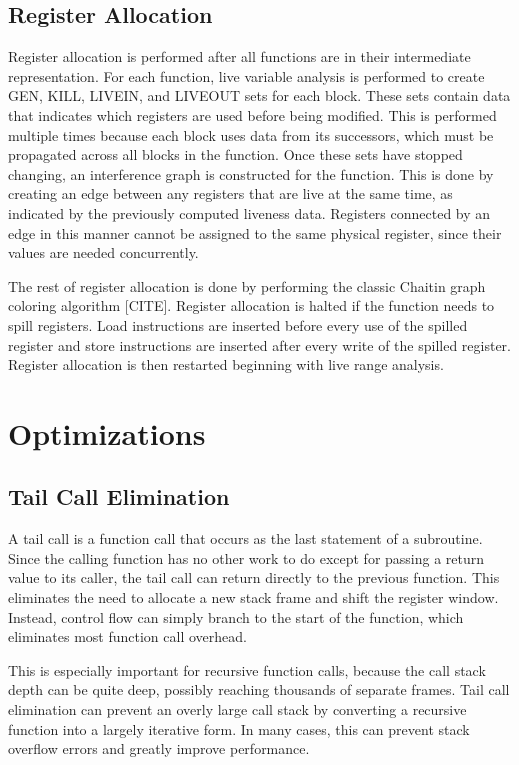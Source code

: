 \documentclass[12pt]{article}
\begin{document}
\begin{multicols}{2}
\subsection{Register Allocation}
Register allocation is performed after all functions are in their intermediate representation.
For each function, live variable analysis is performed to create GEN, KILL, LIVEIN, and LIVEOUT sets for each block.
These sets contain data that indicates which registers are used before being modified.
This is performed multiple times because each block uses data from its successors, which must be propagated across all blocks in the function.
Once these sets have stopped changing, an interference graph is constructed for the function.
This is done by creating an edge between any registers that are live at the same time, as indicated by the previously computed liveness data.
Registers connected by an edge in this manner cannot be assigned to the same physical register, since their values are needed concurrently.

The rest of register allocation is done by performing the classic Chaitin graph coloring algorithm [CITE].
Register allocation is halted if the function needs to spill registers.
Load instructions are inserted before every use of the spilled register and store instructions are inserted after every write of the spilled register.
Register allocation is then restarted beginning with live range analysis.

\section{Optimizations}

\subsection{Tail Call Elimination}
A tail call is a function call that occurs as the last statement of a subroutine.
Since the calling function has no other work to do except for passing a return value to its caller, the tail call can return directly to the previous function.
This eliminates the need to allocate a new stack frame and shift the register window.
Instead, control flow can simply branch to the start of the function, which eliminates most function call overhead.

This is especially important for recursive function calls, because the call stack depth can be quite deep, possibly reaching thousands of separate frames.
Tail call elimination can prevent an overly large call stack by converting a recursive function into a largely iterative form.
In many cases, this can prevent stack overflow errors and greatly improve performance.


\end{multicols}
\end{document}
